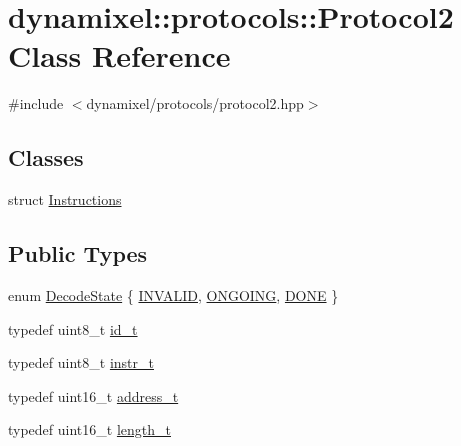 \hypertarget{classdynamixel_1_1protocols_1_1_protocol2}{}\section{dynamixel\+:\+:protocols\+:\+:Protocol2 Class Reference}
\label{classdynamixel_1_1protocols_1_1_protocol2}


{\ttfamily \#include $<$dynamixel/protocols/protocol2.\+hpp$>$}

\subsection*{Classes}
\begin{DoxyCompactItemize}
\item 
struct \hyperlink{structdynamixel_1_1protocols_1_1_protocol2_1_1_instructions}{Instructions}
\end{DoxyCompactItemize}
\subsection*{Public Types}
\begin{DoxyCompactItemize}
\item 
enum \hyperlink{classdynamixel_1_1protocols_1_1_protocol2_ab779d109a8aeea8e2de436f6d23b43ed}{Decode\+State} \{ \hyperlink{classdynamixel_1_1protocols_1_1_protocol2_ab779d109a8aeea8e2de436f6d23b43eda569fcd58d8f9c65c5ee5b5bb1e418631}{I\+N\+V\+A\+L\+I\+D}, 
\hyperlink{classdynamixel_1_1protocols_1_1_protocol2_ab779d109a8aeea8e2de436f6d23b43edac1f7352bfa26dab3bbc18cd4931ad9f9}{O\+N\+G\+O\+I\+N\+G}, 
\hyperlink{classdynamixel_1_1protocols_1_1_protocol2_ab779d109a8aeea8e2de436f6d23b43eda4fdb93754f7b44f8fe28b5a8703bb605}{D\+O\+N\+E}
 \}
\item 
typedef uint8\+\_\+t \hyperlink{classdynamixel_1_1protocols_1_1_protocol2_a38d9cae72cd86213cca74e718c240429}{id\+\_\+t}
\item 
typedef uint8\+\_\+t \hyperlink{classdynamixel_1_1protocols_1_1_protocol2_aa7302f20356607bd51e4d4ecf4cb7abf}{instr\+\_\+t}
\item 
typedef uint16\+\_\+t \hyperlink{classdynamixel_1_1protocols_1_1_protocol2_ac5d0ba762aa1f860c0187d9e64982941}{address\+\_\+t}
\item 
typedef uint16\+\_\+t \hyperlink{classdynamixel_1_1protocols_1_1_protocol2_a962ea2a3d9aa7e6ca7cee3e0c38ce383}{length\+\_\+t}
\end{DoxyCompactItemize}
